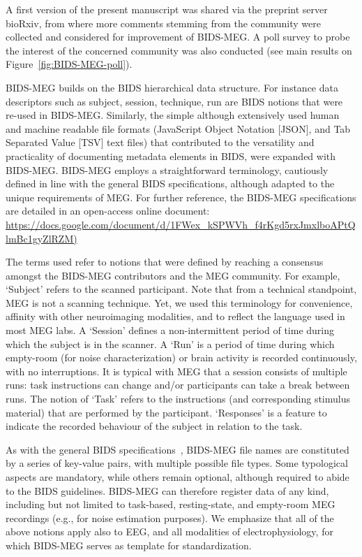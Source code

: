 A first version of the present manuscript was shared via the preprint server bioRxiv, from where more comments stemming from the community were collected and considered for improvement of BIDS-MEG. A poll survey to probe the interest of the concerned community was also conducted (see main results on Figure~\ref{fig:BIDS-MEG-poll}).

BIDS-MEG builds on the BIDS hierarchical data structure. For instance data descriptors such as subject, session, technique, run are BIDS notions that were re-used in BIDS-MEG. Similarly, the simple although extensively used human and machine readable file formats (JavaScript Object Notation [JSON], and Tab Separated Value [TSV] text files) that contributed to the versatility and practicality of documenting metadata elements in BIDS, were expanded with BIDS-MEG. BIDS-MEG employs a straightforward terminology, cautiously defined in line with the general BIDS specifications, although adapted to the unique requirements of MEG.  For further reference, the BIDS-MEG specifications are detailed in an open-access online document:
\url{https://docs.google.com/document/d/1FWex_kSPWVh_f4rKgd5rxJmxlboAPtQlmBc1gyZlRZM)}

The terms used refer to notions that were defined by reaching a consensus amongst the BIDS-MEG contributors and the MEG community. For example, ‘Subject’ refers to the scanned participant. Note that from a technical standpoint, MEG is not a scanning technique. Yet, we used this terminology for convenience, affinity with other neuroimaging modalities, and to reflect the language used in most MEG labs. A ‘Session’ defines a non-intermittent period of time during which the subject is in the scanner.  A ‘Run’ is a period of time during which empty-room (for noise characterization) or brain activity is recorded continuously, with no interruptions. It is typical with MEG that a session consists of multiple runs: task instructions can change and/or participants can take a break between runs. The notion of ‘Task’ refers to the instructions (and corresponding stimulus material) that are performed by the participant. ‘Responses’ is a feature to indicate the recorded behaviour of the subject in relation to the task.

As with the general BIDS specifications~\citep{gorgolewski2016brain}, BIDS-MEG file names are constituted by a series of key-value pairs, with multiple possible file types. Some  typological aspects are mandatory, while others remain optional, although required to abide to the BIDS guidelines. BIDS-MEG can therefore register data of any kind, including but not limited to task-based, resting-state, and empty-room MEG recordings (e.g., for noise estimation purposes). We emphasize that all of the above notions apply also to EEG, and all modalities of electrophysiology, for which BIDS-MEG serves as template for standardization.  

